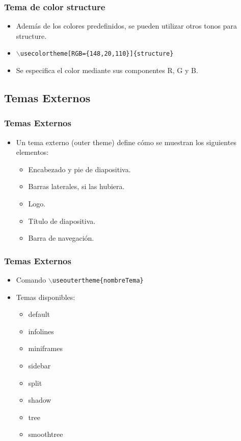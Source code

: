 \documentclass[aspectratio=43]{beamer}%
\newcommand\rojo[1]{\textcolor[RGB]{237,41,57}{#1}}
\begin{document}
\begin{frame}[fragile]
\frametitle{\textbf{Tema de color structure}}
\justifying
\begin{itemize}\justifying
  \item Además de los colores predefinidos, se pueden utilizar otros tonos para structure.
  \item [] \texttt{$\backslash$usecolortheme\rojo{[RGB=\{148,20,110\}]}\{structure\}}
  \item Se especifica el color mediante sus componentes R, G y B.
\end{itemize}
\end{frame}


\subsection{Temas Externos}
\begin{frame}[fragile]
\frametitle{\textbf{Temas Externos}}
\justifying
 \begin{itemize}\justifying
  \item Un tema externo (outer theme) define cómo se muestran los siguientes elementos:
  \begin{itemize}\justifying
  \item Encabezado y pie de diapositiva.
  \item Barras laterales, si las hubiera.
  \item Logo.
  \item Título de diapositiva.
  \item Barra de navegación.
\end{itemize}

\end{itemize}

\end{frame}

\begin{frame}[fragile]
\frametitle{\textbf{Temas Externos}}
\justifying
 \begin{itemize}\justifying
  \item Comando \texttt{$\backslash$useoutertheme\{nombreTema\}}
  \item Temas disponibles:
  \begin{itemize}\justifying
  \item default
  \item infolines
  \item miniframes
  \item sidebar
  \item split
  \item shadow
  \item tree
  \item smoothtree
\end{itemize}

\end{itemize}

\end{frame}
\end{document}
